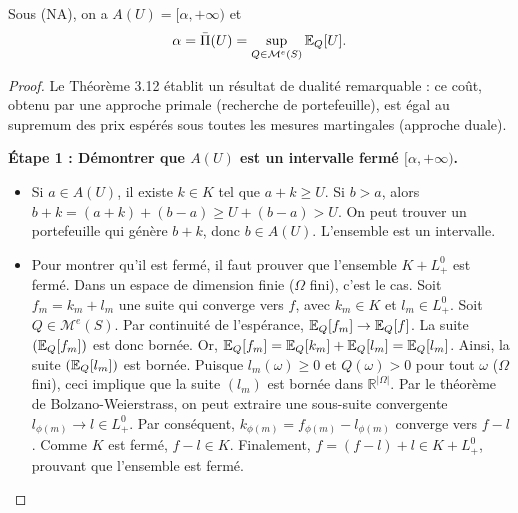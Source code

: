 \begin{theoreme}\label{thm:superhedging_equals_upper_envelope}
Sous (NA), on a $A(U)=[\alpha,+\infty)$ et
\begin{equation}
\alpha=\bar\Pi(U)=\sup_{Q\in\mathcal{M}^e(S)} \mathbb{E}_Q[U].
\end{equation}
\end{theoreme}

\begin{proof}
Le Théorème 3.12 établit un résultat de dualité remarquable : ce coût, obtenu par une approche primale (recherche de portefeuille), est égal au supremum des prix espérés sous toutes les mesures martingales (approche duale).

\textbf{Étape 1 : Démontrer que $A(U)$ est un intervalle fermé $[\alpha, +\infty)$.}
\begin{itemize}
    \item Si $a \in A(U)$, il existe $k \in K$ tel que $a+k \ge U$. Si $b > a$, alors $b+k = (a+k) + (b-a) \ge U + (b-a) > U$. On peut trouver un portefeuille qui génère $b+k$, donc $b \in A(U)$. L'ensemble est un intervalle.
    \item Pour montrer qu'il est fermé, il faut prouver que l'ensemble $K + L^0_+$ est fermé. Dans un espace de dimension finie ($\Omega$ fini), c'est le cas. Soit $f_m = k_m + l_m$ une suite qui converge vers $f$, avec $k_m \in K$ et $l_m \in L^0_+$. Soit $Q \in \mathcal{M}^e(S)$. Par continuité de l'espérance, $\mathbb{E}_Q[f_m] \to \mathbb{E}_Q[f]$. La suite $(\mathbb{E}_Q[f_m])$ est donc bornée. Or, $\mathbb{E}_Q[f_m] = \mathbb{E}_Q[k_m] + \mathbb{E}_Q[l_m] = \mathbb{E}_Q[l_m]$. Ainsi, la suite $(\mathbb{E}_Q[l_m])$ est bornée. Puisque $l_m(\omega) \ge 0$ et $Q(\omega) > 0$ pour tout $\omega$ ($\Omega$ fini), ceci implique que la suite $(l_m)$ est bornée dans $\mathbb{R}^{|\Omega|}$. Par le théorème de Bolzano-Weierstrass, on peut extraire une sous-suite convergente $l_{\phi(m)} \to l \in L^0_+$. Par conséquent, $k_{\phi(m)} = f_{\phi(m)} - l_{\phi(m)}$ converge vers $f-l$. Comme $K$ est fermé, $f-l \in K$. Finalement, $f = (f-l) + l \in K + L^0_+$, prouvant que l'ensemble est fermé.
\end{itemize}


\end{proof}

